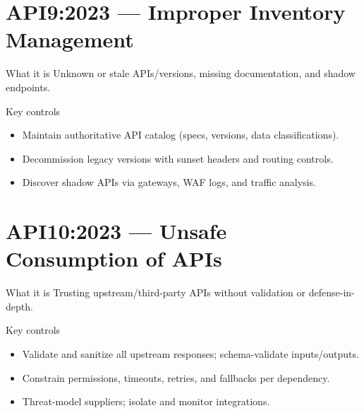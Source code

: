 \documentclass[11pt,a4paper]{article}
\begin{document}
\section{API9:2023 — Improper Inventory Management}
\begin{callout}{What it is}
Unknown or stale APIs/versions, missing documentation, and shadow endpoints.
\end{callout}
\begin{callout}{Key controls}
\begin{itemize}
  \item Maintain authoritative API catalog (specs, versions, data classifications).
  \item Decommission legacy versions with sunset headers and routing controls.
  \item Discover shadow APIs via gateways, WAF logs, and traffic analysis.
\end{itemize}
\end{callout}

\section{API10:2023 — Unsafe Consumption of APIs}
\begin{callout}{What it is}
Trusting upstream/third\mbox{-}party APIs without validation or defense\mbox{-}in\mbox{-}depth.
\end{callout}
\begin{callout}{Key controls}
\begin{itemize}
  \item Validate and sanitize all upstream responses; schema\mbox{-}validate inputs/outputs.
  \item Constrain permissions, timeouts, retries, and fallbacks per dependency.
  \item Threat\mbox{-}model suppliers; isolate and monitor integrations.
\end{itemize}
\end{callout}
\end{document}
